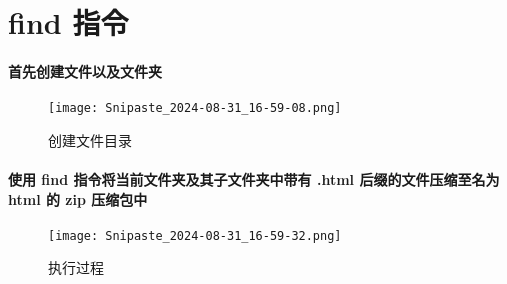 \documentclass[a4paper, 12pt]{article}
\begin{document}
    \section{find 指令}
    \paragraph{首先创建文件以及文件夹}
    \begin{figure}[h]
        \centering
        \texttt{[image: Snipaste\_2024-08-31\_16-59-08.png]}
        \caption{创建文件目录}
        \label{fig:创建文件目录}
    \end{figure}
    \paragraph{使用 find 指令将当前文件夹及其子文件夹中带有 .html 后缀的文件压缩至名为 html 的 zip 压缩包中}
    \begin{figure}[h]
        \centering
        \texttt{[image: Snipaste\_2024-08-31\_16-59-32.png]}
        \caption{执行过程}
        \label{fig:执行过程}
    \end{figure}
    
\end{document}
